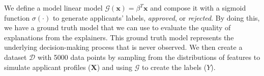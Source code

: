 \documentclass[mnsc,blindrev]{informs3}
\newcommand{\bx}{\mathbf{x}}
\begin{document}



   We define a model linear model $\mathcal{G}(\bx)=\beta^T\bx$ and compose it with a sigmoid function $\sigma(\cdot)$ to generate applicants' labels, \textit{approved}, or \textit{rejected}. By doing this, we have a ground truth model that we can use to evaluate the quality of explanations from the explainers. This ground truth model represents the underlying decision-making process that is never observed.  %
   We then create a dataset $\mathcal{D}$ with 5000 data points by sampling from the distributions of features to simulate applicant profiles ($\mathbf{X}$) and using $\mathcal{G}$ to create the labels ($Y$).  
\end{document}
